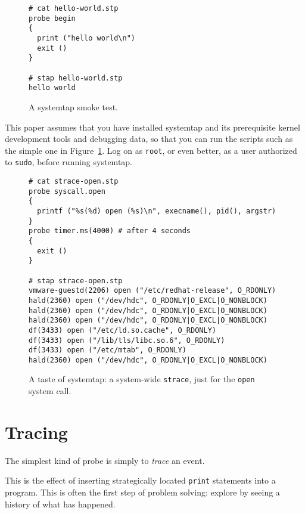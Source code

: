 \documentclass{article}
\newenvironment{boxedminipage}%
    {\begin{makeimage}\begin{center}\begin{Sbox}\begin{minipage}}%
    {\end{minipage}\end{Sbox}\fbox{\TheSbox}\end{center}\end{makeimage}}
\renewcommand{\nomenclature}[2]{}
\begin{document}
\begin{figure}[!ht]
\begin{boxedminipage}{4.5in}
\begin{verbatim}
# cat hello-world.stp
probe begin 
{
  print ("hello world\n")
  exit ()
}

# stap hello-world.stp
hello world
\end{verbatim}
\end{boxedminipage}
\label{fig:hello-world}
\caption{A systemtap smoke test.}
\end{figure}

This paper assumes that you have installed systemtap and its
prerequisite kernel development tools and debugging data, so that you
can run the scripts such as the simple one in
Figure~\ref{fig:hello-world}.  Log on as \verb+root+, or even better,
as a user authorized to \verb+sudo+, before running systemtap.

\begin{figure}[ht]
\begin{boxedminipage}{4.5in}
\begin{verbatim}
# cat strace-open.stp
probe syscall.open
{
  printf ("%s(%d) open (%s)\n", execname(), pid(), argstr) 
}
probe timer.ms(4000) # after 4 seconds
{
  exit ()
}

# stap strace-open.stp
vmware-guestd(2206) open ("/etc/redhat-release", O_RDONLY)
hald(2360) open ("/dev/hdc", O_RDONLY|O_EXCL|O_NONBLOCK)
hald(2360) open ("/dev/hdc", O_RDONLY|O_EXCL|O_NONBLOCK)
hald(2360) open ("/dev/hdc", O_RDONLY|O_EXCL|O_NONBLOCK)
df(3433) open ("/etc/ld.so.cache", O_RDONLY)
df(3433) open ("/lib/tls/libc.so.6", O_RDONLY)
df(3433) open ("/etc/mtab", O_RDONLY)
hald(2360) open ("/dev/hdc", O_RDONLY|O_EXCL|O_NONBLOCK)
\end{verbatim}
\end{boxedminipage}
\label{fig:strace-open}
\caption{A taste of systemtap: a system-wide {\tt strace}, just for
the {\tt open} system call.}
\end{figure}
\nomenclature{strace}{A standard ptrace-based command line tool to trace system call activity of a process.}

\section{Tracing}

The simplest kind of probe is simply to {\em trace} an event.
\nomenclature{trace}{A compact textual record of an event occurrence.}
This is the effect of inserting strategically located \verb+print+
statements into a program.  This is often the first step of problem
solving: explore by seeing a history of what has happened.
\end{document}
